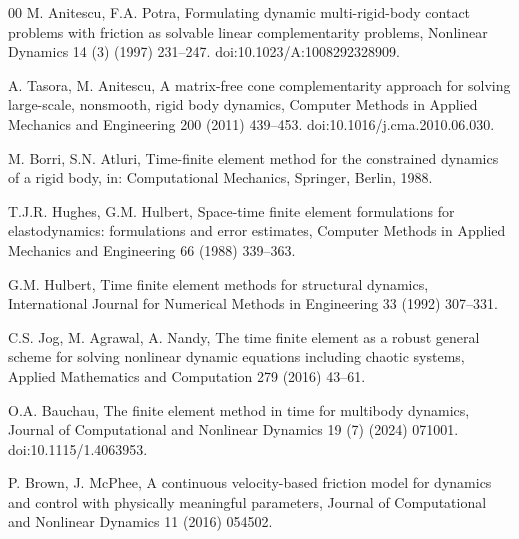 \documentclass[preprint,12pt]{elsarticle}
\begin{document}
\begin{thebibliography}{00}
M. Anitescu, F.A. Potra,
Formulating dynamic multi-rigid-body contact problems with friction as
solvable linear complementarity problems,
Nonlinear Dynamics 14 (3) (1997) 231--247.
doi:10.1023/A:1008292328909.

A. Tasora, M. Anitescu,
A matrix-free cone complementarity approach for solving large-scale,
nonsmooth, rigid body dynamics,
Computer Methods in Applied Mechanics and Engineering 200 (2011) 439--453.
doi:10.1016/j.cma.2010.06.030.

M. Borri, S.N. Atluri,
Time-finite element method for the constrained dynamics of a rigid body,
in: Computational Mechanics, Springer, Berlin, 1988.

T.J.R. Hughes, G.M. Hulbert,
Space-time finite element formulations for elastodynamics: formulations and
error estimates,
Computer Methods in Applied Mechanics and Engineering 66 (1988) 339--363.

G.M. Hulbert,
Time finite element methods for structural dynamics,
International Journal for Numerical Methods in Engineering 33 (1992)
307--331.

C.S. Jog, M. Agrawal, A. Nandy,
The time finite element as a robust general scheme for solving nonlinear
dynamic equations including chaotic systems,
Applied Mathematics and Computation 279 (2016) 43--61.

O.A. Bauchau,
The finite element method in time for multibody dynamics,
Journal of Computational and Nonlinear Dynamics 19 (7) (2024) 071001.
doi:10.1115/1.4063953.

P. Brown, J. McPhee,
A continuous velocity-based friction model for dynamics and control with
physically meaningful parameters,
Journal of Computational and Nonlinear Dynamics 11 (2016) 054502.

\end{thebibliography}
\end{document}
